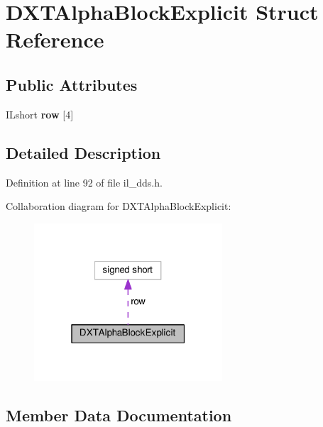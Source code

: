 \hypertarget{structDXTAlphaBlockExplicit}{}\section{D\+X\+T\+Alpha\+Block\+Explicit Struct Reference}
\label{structDXTAlphaBlockExplicit}
\subsection*{Public Attributes}
\begin{DoxyCompactItemize}
\item 
\mbox{\label{structDXTAlphaBlockExplicit_afc7a938f00a0996bf27cc21aed258e85}} 
I\+Lshort {\bfseries row} \mbox{[}4\mbox{]}
\end{DoxyCompactItemize}


\subsection{Detailed Description}


Definition at line 92 of file il\+\_\+dds.\+h.



Collaboration diagram for D\+X\+T\+Alpha\+Block\+Explicit\+:
\nopagebreak
\begin{figure}[H]
\begin{center}
\leavevmode
\includegraphics[width=199pt]{da/df0/structDXTAlphaBlockExplicit__coll__graph}
\end{center}
\end{figure}


\subsection{Member Data Documentation}
\mbox{\label{structDXTAlphaBlockExplicit_afc7a938f00a0996bf27cc21aed258e85}} 
